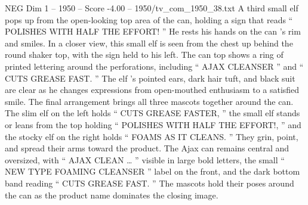 \begin{textsample}{NEG Dim 1 – 1950 – Score -4.00 – 1950/tv\_com\_1950\_38.txt}
A third small elf pops up from the open-looking top area of the can, holding a sign that reads “ POLISHES WITH HALF THE EFFORT! ” He rests his hands on the can ’s rim and smiles.
In a closer view, this small elf is seen from the chest up behind the round shaker top, with the sign held to his left.
The can top shows a ring of printed lettering around the perforations, including “ AJAX CLEANSER ” and “ CUTS GREASE FAST. ” The elf ’s pointed ears, dark hair tuft, and black suit are clear as he changes expressions from open-mouthed enthusiasm to a satisfied smile.
The final arrangement brings all three mascots together around the can.
The slim elf on the left holds “ CUTS GREASE FASTER, ” the small elf stands or leans from the top holding “ POLISHES WITH HALF THE EFFORT!, ” and the stocky elf on the right holds “ FOAMS AS IT CLEANS. ” They grin, point, and spread their arms toward the product.
The Ajax can remains central and oversized, with “ AJAX CLEAN … ” visible in large bold letters, the small “ NEW TYPE FOAMING CLEANSER ” label on the front, and the dark bottom band reading “ CUTS GREASE FAST. ” The mascots hold their poses around the can as the product name dominates the closing image.

\end{textsample}
